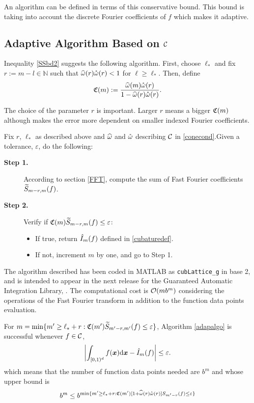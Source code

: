 \documentclass[graybox,footinfo]{svmult}
\newcommand{\N}{\mathbb{N}} %
\newcommand{\bsx}{\boldsymbol{x}}    %
\begin{document}
An algorithm can be defined in terms of this conservative bound. This bound is taking into account the discrete Fourier coefficients of $f$ which makes it adaptive. 

\subsection{Adaptive Algorithm Based on $\mathcal{C}$}

Inequality \eqref{SSbd2} suggests the following algorithm. First, choose $\ell_*$ and fix $r:=m-l \in \N$ such that $\widehat{\omega}(r)\mathring{\omega}(r)<1$ for $\ell\geq\ell_*$. Then, define
\[
\mathfrak{C}(m):= \frac{\widehat{\omega}(m) \mathring{\omega}(r)}{1 - \widehat{\omega}(r) \mathring{\omega}(r)}.
\]

The choice of the parameter $r$ is important. Larger $r$ means a bigger $\mathfrak{C}(m)$ although makes the error more dependent on smaller indexed Fourier coefficients.

\begin{algo} \label{adapalgo} Fix $r$, $\ell_*$ as described above and $\widehat{\omega}$ and $\mathring{\omega}$ describing $\mathcal{C}$ in \eqref{conecond}.Given a tolerance, $\varepsilon$, do the following:

\begin{description}
\item[\textbf{Step 1.}] According to section \ref{FFT}, compute the sum of Fast Fourier coefficients $\widetilde{S}_{m-r,m}(f)$.

\item[\textbf{Step 2.}] Verify if $\mathfrak{C}(m)  \widetilde{S}_{m-r,m}(f) \le \varepsilon$:
\begin{itemize}
\item If true, return $\hat{I}_m(f)$ defined in \eqref{cubaturedef}.
\item If not, increment $m$ by one, and go to Step 1.
\end{itemize} 
\end{description}
\end{algo}

The algorithm described has been coded in MATLAB as \texttt{cubLattice\_g} in base 2, and is intended to appear in the next release for the Guaranteed Automatic Integration Library, \cite{ChoEtal14a}.
The computational cost is $\mathcal{O}(m b^m)$ considering the operations of the Fast Fourier transform in addition to the function data points evaluation.

\begin{theorem} \label{adapalgothm} For $m = \min \{m' \ge \ell_*+r : \mathfrak{C}(m')  \widetilde{S}_{m'-r,m'}(f) \le \varepsilon \}$, Algorithm \ref{adapalgo} is successful whenever $f\in\mathcal{C}$,
\[
\biggabs{\int_{\cube} f(\bsx) \D \bsx - \hI_m(f)} \le \varepsilon.
\]
which means that the number of function data points needed are $b^m$ and whose upper bound is
\[
b^m \le b^{\min \{m' \ge \ell_*+r : \mathfrak{C}(m') [1+ \widehat{\omega}(r) \mathring{\omega}(r)] S_{m'-r}(f) \le \varepsilon \}}
\]
\end{theorem}
\end{document}

